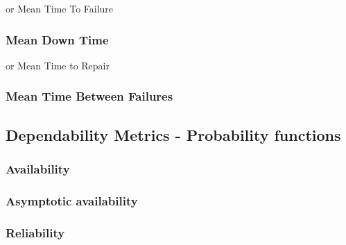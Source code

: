 or Mean Time To Failure

\subsubsection{Mean Down Time}

or Mean Time to Repair

\subsubsection{Mean Time Between Failures}



\subsection{Dependability Metrics - Probability functions} \label{background-dep-metrics-prob-funcs}

\subsubsection{Availability}

\subsubsection{Asymptotic availability}

\subsubsection{Reliability}






